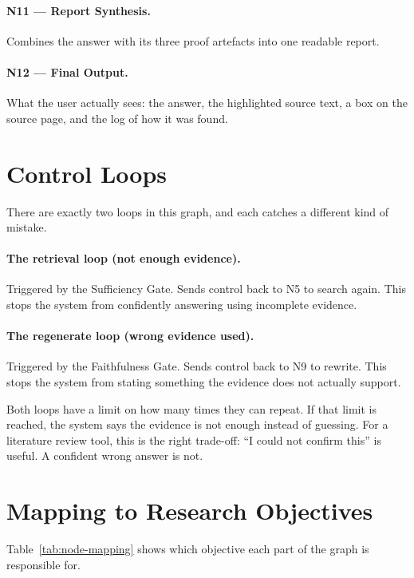 \paragraph{N11 --- Report Synthesis.}
Combines the answer with its three proof artefacts into one readable report.

\paragraph{N12 --- Final Output.}
What the user actually sees: the answer, the highlighted source text, a box on the
source page, and the log of how it was found.

\section{Control Loops}

There are exactly two loops in this graph, and each catches a different kind of
mistake.

\paragraph{The retrieval loop (not enough evidence).}
Triggered by the Sufficiency Gate. Sends control back to N5 to search again. This
stops the system from confidently answering using incomplete evidence.

\paragraph{The regenerate loop (wrong evidence used).}
Triggered by the Faithfulness Gate. Sends control back to N9 to rewrite. This stops
the system from stating something the evidence does not actually support.

Both loops have a limit on how many times they can repeat. If that limit is
reached, the system says the evidence is not enough instead of guessing. For a
literature review tool, this is the right trade-off: ``I could not confirm this''
is useful. A confident wrong answer is not.

\section{Mapping to Research Objectives}

Table~\ref{tab:node-mapping} shows which objective each part of the graph is
responsible for.

